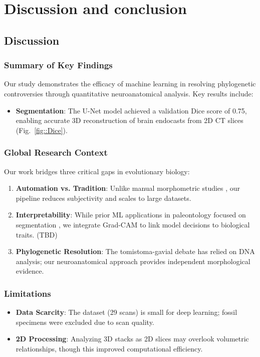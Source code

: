 \chapter{Discussion and conclusion}
\section{Discussion}
\subsection{Summary of Key Findings}
Our study demonstrates the efficacy of machine learning in resolving phylogenetic controversies through quantitative neuroanatomical analysis. Key results include:
\begin{itemize}
    \item \textbf{Segmentation}: The U-Net model achieved a validation Dice score of 0.75, enabling accurate 3D reconstruction of brain endocasts from 2D CT slices (Fig.~\ref{fig::Dice}).
\end{itemize}

\subsection{Global Research Context}
Our work bridges three critical gaps in evolutionary biology:
\begin{enumerate}
    \item \textbf{Automation vs. Tradition}: Unlike manual morphometric studies \cite{Beyrand_2019}, our pipeline reduces subjectivity and scales to large datasets.
    \item \textbf{Interpretability}: While prior ML applications in paleontology focused on segmentation \cite{Yu_2022}, we integrate Grad-CAM \cite{Selvaraju_2017} to link model decisions to biological traits. (TBD)
    \item \textbf{Phylogenetic Resolution}: The tomistoma-gavial debate has relied on DNA analysis; our neuroanatomical approach provides independent morphological evidence.
\end{enumerate}


\subsection{Limitations}
\begin{itemize}
    \item \textbf{Data Scarcity}: The dataset (29 scans) is small for deep learning; fossil specimens were excluded due to scan quality.
    \item \textbf{2D Processing}: Analyzing 3D stacks as 2D slices may overlook volumetric relationships, though this improved computational efficiency.
\end{itemize}

